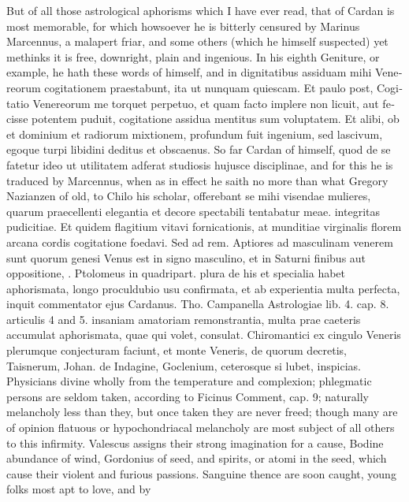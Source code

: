 But of all those astrological aphorisms which I have ever read, that of
Cardan is most memorable, for which howsoever he is bitterly censured
by Marinus Marcennus, a malapert friar, and some others (which
 he himself suspected) yet methinks it is free, downright, plain
and ingenious. In his eighth Geniture, or example, he hath these
words of himself, \conjunction{} \Venus{} and \Mercury in \Mercury \textlatin{dignitatibus assiduam mihi Venereorum
cogitationem praestabunt, ita ut nunquam quiescam. Et paulo post,
Cogitatio Venereorum me torquet perpetuo, et quam facto implere non
licuit, aut fecisse potentem puduit, cogitatione assidua mentitus sum
voluptatem. Et alibi, ob \leftmoon{} et \Mercury{} dominium et radiorum mixtionem,
profundum fuit ingenium, sed lascivum, egoque turpi libidini deditus et
obscaenus}. So far Cardan of himself, quod de se fatetur ideo ut
utilitatem adferat studiosis hujusce disciplinae, and for this he is
traduced by Marcennus, when as in effect he saith no more than what
Gregory Nazianzen of old, to Chilo his scholar, offerebant se mihi
visendae mulieres, quarum praecellenti elegantia et decore spectabili
tentabatur meae. integritas pudicitiae. Et quidem flagitium vitavi
fornicationis, at munditiae virginalis florem arcana cordis cogitatione
foedavi. Sed ad rem. Aptiores ad masculinam venerem sunt quorum genesi
Venus est in signo masculino, et in Saturni finibus aut oppositione,
\etc{}. Ptolomeus in quadripart. plura de his et specialia habet
aphorismata, longo proculdubio usu confirmata, et ab experientia multa
perfecta, inquit commentator ejus Cardanus. Tho. Campanella Astrologiae
lib. 4. cap. 8. articulis 4 and 5. insaniam amatoriam remonstrantia,
multa prae caeteris accumulat aphorismata, quae qui volet, consulat.
Chiromantici ex cingulo Veneris plerumque conjecturam faciunt, et monte
Veneris, de quorum decretis, Taisnerum, Johan. de Indagine, Goclenium,
ceterosque si lubet, inspicias. Physicians divine wholly from the
temperature and complexion; phlegmatic persons are seldom taken,
according to Ficinus Comment, cap. 9; naturally melancholy less than
they, but once taken they are never freed; though many are of opinion
flatuous or hypochondriacal melancholy are most subject of all others
to this infirmity. Valescus assigns their strong imagination for a
cause, Bodine abundance of wind, Gordonius of seed, and spirits, or
atomi in the seed, which cause their violent and furious passions.
Sanguine thence are soon caught, young folks most apt to love, and by
